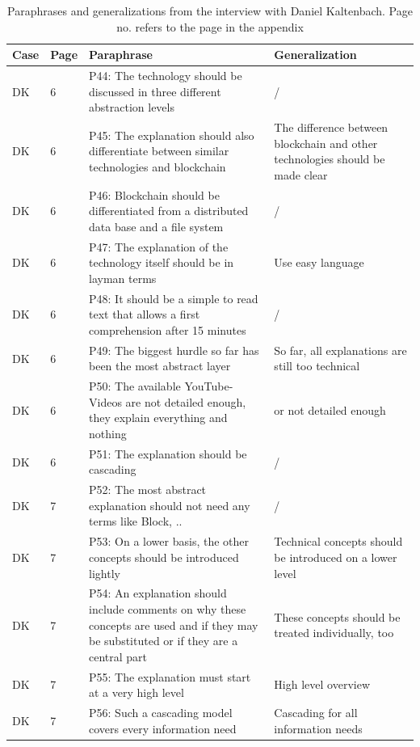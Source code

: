 \begin{table}[H]
    \centering
    \begin{tabularx}{\textwidth}{ll|X|p{4.5cm}}
    Case & Page & Paraphrase & Generalization  \\ \hline
    DK & 6 & P44: The technology should be discussed in three different abstraction levels & /   \\
	DK & 6 & P45: The explanation should also differentiate between similar technologies and blockchain & The difference between blockchain and other technologies should be made clear  \\
	DK & 6 & P46: Blockchain should be differentiated from a distributed data base and a file system & /  \\
	DK & 6 & P47: The explanation of the technology itself should be in layman terms & Use easy language   \\
	DK & 6 & P48: It should be a simple to read text that allows a first comprehension after 15 minutes & /  \\
	DK & 6 & P49: The biggest hurdle so far has been the most abstract layer & So far, all explanations are still too technical\\
	DK & 6 & P50: The available YouTube-Videos are not detailed enough, they explain everything and nothing & or not detailed enough  \\
	DK & 6 & P51: The explanation should be cascading & / \\
	DK & 7 & P52: The most abstract explanation should not need any terms like Block, .. & /   \\
	DK & 7 & P53: On a lower basis, the other concepts should be introduced lightly & Technical concepts should be introduced on a lower level  \\
	DK & 7 & P54: An explanation should include comments on why these concepts are used and if they may be substituted or if they are a central part & These concepts should be treated individually, too  \\
	DK & 7 & P55: The explanation must start at a very high level & High level overview  \\
	DK & 7 & P56: Such a cascading model covers every information need & Cascading for all information needs \\
    \end{tabularx}
    \caption{Paraphrases and generalizations from the interview with Daniel Kaltenbach. Page no. refers to the page in the appendix}
\end{table}

